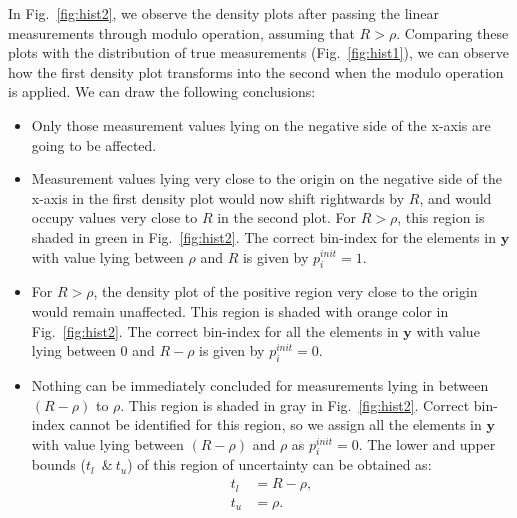 In Fig.~\ref{fig:hist2}, we observe the density plots after passing the linear measurements through modulo operation, assuming that $R>\rho$. Comparing these plots with the distribution of true measurements (Fig.~\ref{fig:hist1}), we can observe how the first density plot transforms into the second when the modulo operation is applied. We can draw the following conclusions:

\begin{itemize}
	\item Only those measurement values lying on the negative side of the x-axis are going to be affected.
	\item Measurement values lying very close to the origin on the negative side of the x-axis in the first density plot would now shift rightwards by $R$, and would occupy values very close to $R$ in the second plot. For $R>\rho$, this region is shaded in green in Fig.~\ref{fig:hist2}. The correct bin-index for the elements in $\mathbf{y}$ with value lying between $\rho$ and $R$ is given by $p^{init}_{i} = 1$.
	\item For $R>\rho$, the density plot of the positive region very close to the origin would remain unaffected. This region is shaded with orange color in Fig.~\ref{fig:hist2}. The correct bin-index for all the elements in $\mathbf{y}$ with value lying between $0$ and $R-\rho$ is given by $p^{init}_{i} = 0$.
	\item Nothing can be immediately concluded for measurements lying in between $(R-\rho)$ to $\rho$. This region is shaded in gray in Fig.~\ref{fig:hist2}. Correct bin-index cannot be identified for this region, so we assign all the elements in $\mathbf{y}$ with value lying between $(R-\rho)$ and $\rho$ as $p^{init}_{i} = 0$. The lower and upper bounds ($t_l$~\&$~t_u$) of this region of uncertainty can be obtained as:
	\begin{align*}
	t_l & = R-\rho, \\
	t_u & = \rho.
	\end{align*}
\end{itemize}

